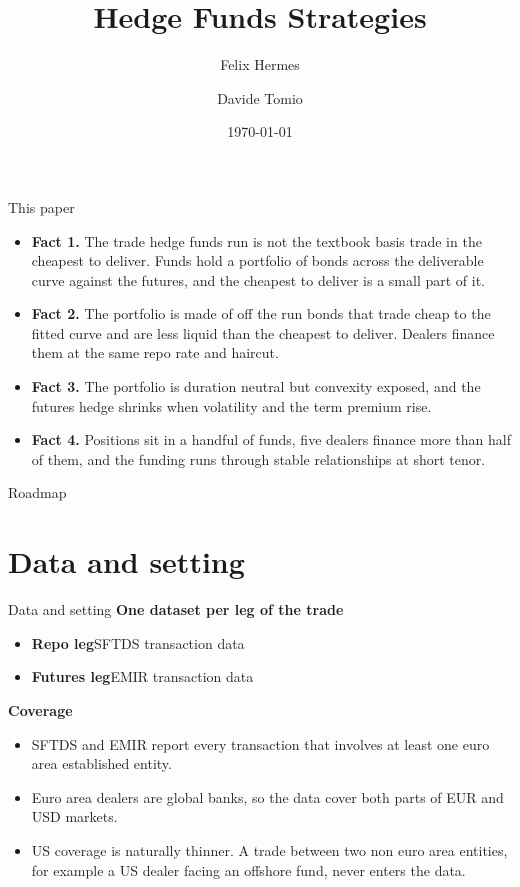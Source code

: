 \documentclass[aspectratio=169,11pt]{beamer}
\title{Hedge Funds Strategies}
\author{Felix Hermes \and Davide Tomio}
\date{\today}
\begin{document}
\begin{frame}
  \titlepage
\end{frame}

\begin{frame}{This paper}
  \begin{itemize}
    \item \textbf{Fact 1.} The trade hedge funds run is not the textbook basis trade in the cheapest to deliver. Funds hold a portfolio of bonds across the deliverable curve against the futures, and the cheapest to deliver is a small part of it.
    \item \textbf{Fact 2.} The portfolio is made of off the run bonds that trade cheap to the fitted curve and are less liquid than the cheapest to deliver. Dealers finance them at the same repo rate and haircut.
    \item \textbf{Fact 3.} The portfolio is duration neutral but convexity exposed, and the futures hedge shrinks when volatility and the term premium rise.
    \item \textbf{Fact 4.} Positions sit in a handful of funds, five dealers finance more than half of them, and the funding runs through stable relationships at short tenor.
  \end{itemize}
\end{frame}

\begin{frame}{Roadmap}
  \tableofcontents[hideallsubsections]
\end{frame}



\section{Data and setting}
\begin{frame}{Data and setting}
  \textbf{One dataset per leg of the trade}
  \begin{itemize}
    \item \textbf{Repo leg}\quad SFTDS transaction data
    \item \textbf{Futures leg}\quad EMIR transaction data
  \end{itemize}
  \bigskip
  \textbf{Coverage}
  \begin{itemize}
    \item SFTDS and EMIR report every transaction that involves at least one euro area established entity.
    \item Euro area dealers are global banks, so the data cover both parts of EUR and USD markets.
    \item US coverage is naturally thinner. A trade between two non euro area entities, for example a US dealer facing an offshore fund, never enters the data.
  \end{itemize}
\end{frame}
\end{document}
